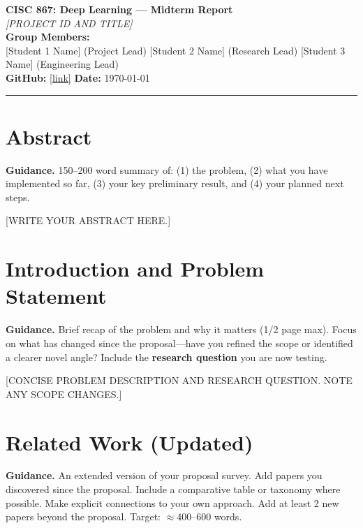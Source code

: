 \documentclass[11pt, letterpaper]{article}
\begin{document}
{\centering
  {\Large\textbf{CISC 867: Deep Learning --- Midterm Report}}\\[0.5em]
  {\large\textit{[PROJECT ID AND TITLE]}}\\[0.4em]
  \textbf{Group Members:}\\
  {[Student 1 Name]} (Project Lead) \quad
  {[Student 2 Name]} (Research Lead) \quad
  {[Student 3 Name]} (Engineering Lead)\\[0.3em]
  \textbf{GitHub:} \url{[link]} \quad \textbf{Date:} \today\\[0.4em]
  \rule{\linewidth}{0.4pt}
}

\section{Abstract}

\begin{guidancebox}
\textbf{Guidance.} 150--200 word summary of: (1) the problem, (2) what you have
implemented so far, (3) your key preliminary result, and (4) your planned next steps.
\end{guidancebox}

[WRITE YOUR ABSTRACT HERE.]

\section{Introduction and Problem Statement}

\begin{guidancebox}
\textbf{Guidance.} Brief recap of the problem and why it matters (1/2 page max).
Focus on what has changed since the proposal---have you refined the scope or identified
a clearer novel angle? Include the \textbf{research question} you are now testing.
\end{guidancebox}

[CONCISE PROBLEM DESCRIPTION AND RESEARCH QUESTION. NOTE ANY SCOPE CHANGES.]

\section{Related Work (Updated)}

\begin{guidancebox}
\textbf{Guidance.} An extended version of your proposal survey. Add papers you
discovered since the proposal. Include a comparative table or taxonomy where possible.
Make explicit connections to your own approach. Add at least 2 new papers beyond
the proposal. Target: $\approx$400--600 words.
\end{guidancebox}
\end{document}

